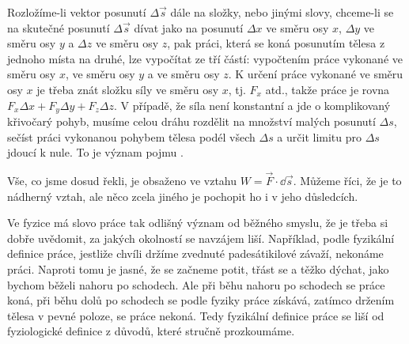 {    Rozložíme-li vektor posunutí \(\Delta\vec{s}\) dále na složky, nebo jinými slovy, chceme-li se 
    na skutečné posunutí \(\Delta\vec{s}\) dívat jako na posunutí \(\Delta x\) ve směru osy \(x\), 
    \(\Delta y\) ve směru osy \(y\) a \(\Delta z\) ve směru osy \(z\), pak práci, která se koná 
    posunutím tělesa z jednoho místa na druhé, lze vypočítat ze tří částí: vypočtením práce 
    vykonané ve směru osy \(x\), ve směru osy \(y\) a ve směru osy \(z\). K určení práce 
    vykonané ve směru osy \(x\) je třeba znát složku síly ve směru osy \(x\), tj. \(F_x\) atd., 
    takže práce je rovna \(F_x\Delta x + F_y\Delta y + F_z\Delta z\). V případě, že síla není 
    konstantní a jde o komplikovaný křivočarý pohyb, musíme celou dráhu rozdělit na množství malých 
    posunutí \(\Delta s\), sečíst práci vykonanou pohybem tělesa podél všech \(\Delta s\) a určit 
    limitu pro \(\Delta s\) jdoucí k nule. To je význam pojmu .
    
    Vše, co jsme dosud řekli, je obsaženo ve vztahu \(W=\vec{F}\cdot\dd\vec{s}\). Můžeme říci, že 
    je to nádherný vztah, ale něco zcela jiného je pochopit ho i v jeho důsledcích.
    
    Ve fyzice má slovo práce tak odlišný význam od běžného smyslu, že je třeba si dobře uvědomit, 
    za jakých okolností se navzájem liší. Například, podle fyzikální definice práce, jestliže 
    chvíli držíme zvednuté padesátikilové závaží, nekonáme práci. Naproti tomu je jasné, že se 
    začneme potit, třást se a těžko dýchat, jako bychom běželi nahoru po schodech. Ale při běhu 
    nahoru po schodech se práce koná, při běhu dolů po schodech se podle fyziky práce získává, 
    zatímco držením tělesa v pevné poloze, se práce nekoná. Tedy fyzikální definice práce se liší 
    od fyziologické definice z důvodů, které stručně prozkoumáme.
    
}
